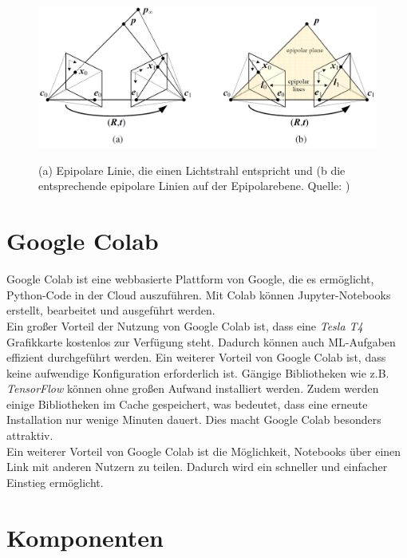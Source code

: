 \begin{figure}[h]
    \centering
    \includegraphics[width=\textwidth]{images/depth_sample.png}
    \label{fig:stereo_depth}
    \caption{(a) Epipolare Linie, die einen Lichtstrahl entspricht und (b die entsprechende epipolare Linien auf der Epipolarebene. Quelle: \cite{cv_Szeliski})}
\end{figure}


\section{Google Colab}

Google Colab ist eine webbasierte Plattform von Google, die es ermöglicht, Python-Code in der Cloud auszuführen. Mit Colab können Jupyter-Notebooks erstellt, bearbeitet und ausgeführt werden.
\\
Ein großer Vorteil der Nutzung von Google Colab ist, dass eine \textit{Tesla T4} Grafikkarte kostenlos zur Verfügung steht. Dadurch können auch \ac{ML}-Aufgaben effizient durchgeführt werden. Ein weiterer Vorteil von Google Colab ist, dass keine aufwendige Konfiguration erforderlich ist. Gängige Bibliotheken wie z.B. \textit{TensorFlow} können ohne großen Aufwand installiert werden. Zudem werden einige Bibliotheken im Cache gespeichert, was bedeutet, dass eine erneute Installation nur wenige Minuten dauert. Dies macht Google Colab besonders attraktiv.
\\
Ein weiterer Vorteil von Google Colab ist die Möglichkeit, Notebooks über einen Link mit anderen Nutzern zu teilen. Dadurch wird ein schneller und einfacher Einstieg ermöglicht.
\cite{colab}

\section{Komponenten}

